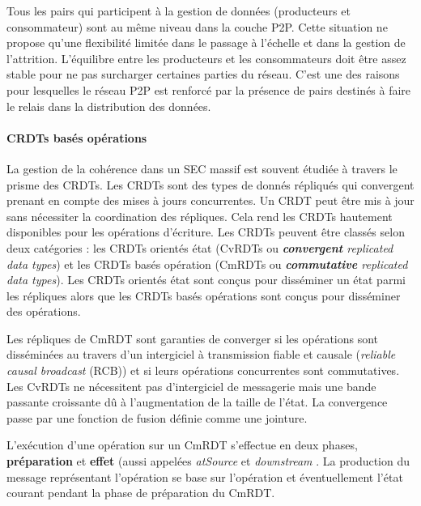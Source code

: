 Tous les pairs qui participent à la gestion de 
données (producteurs et consommateur) sont au même 
niveau dans la couche \gls{P2P}. Cette situation ne propose qu'une flexibilité 
limitée dans le passage à l'échelle et dans la gestion de l'attrition. L'équilibre entre 
les producteurs 
et les consommateurs doit être assez stable pour ne pas surcharger certaines 
parties du réseau. C'est une des raisons pour lesquelles le réseau 
\gls{P2P} est renforcé par la présence de pairs destinés à 
faire le relais dans la distribution des données. 


\paragraph{\glspl{CRDT} basés opérations}
La gestion de la cohérence dans un \gls{SEC} massif est souvent étudiée à 
travers le prisme des \glspl{CRDT}. Les \glspl{CRDT} sont des 
types de 
donnés répliqués qui convergent prenant en compte des mises à jours 
concurrentes. 
Un \gls{CRDT} peut être mis à jour sans nécessiter la coordination des répliques. 
Cela rend les \glspl{CRDT} hautement disponibles pour les opérations d'écriture. 
Les \glspl{CRDT} peuvent être classés selon deux catégories : les \glspl{CRDT} 
orientés état (CvRDTs ou \textit{\textbf{convergent} replicated data types}) et les 
\glspl{CRDT} basés opération (CmRDTs ou\textit{ \textbf{commutative} replicated 
data types}). Les \glspl{CRDT} orientés état sont conçus pour disséminer un 
état parmi les répliques alors que les \glspl{CRDT} basés opérations sont conçus 
pour disséminer des opérations.

Les répliques de CmRDT sont garanties de converger si les opérations sont 
disséminées au travers d'un intergiciel à transmission fiable et causale 
(\textit{reliable causal broadcast} (RCB)) et si leurs opérations concurrentes sont 
commutatives.
Les CvRDTs ne nécessitent pas d'intergiciel de messagerie mais une bande 
passante croissante dû à l'augmentation de la taille de l'état. La convergence 
passe par une fonction de fusion définie comme une jointure.

L'exécution d'une opération sur un CmRDT s'effectue en deux phases, 
\textbf{préparation} et \textbf{effet} (aussi appelées \textit{atSource} et 
\textit{downstream} \cite{Shapiro2011}. La production du message représentant 
l'opération se base sur l'opération et éventuellement l'état courant pendant la 
phase de préparation du CmRDT.

